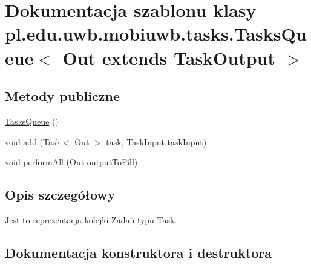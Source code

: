 \hypertarget{classpl_1_1edu_1_1uwb_1_1mobiuwb_1_1tasks_1_1_tasks_queue}{}\section{Dokumentacja szablonu klasy pl.\+edu.\+uwb.\+mobiuwb.\+tasks.\+Tasks\+Queue$<$ Out extends Task\+Output $>$}
\label{classpl_1_1edu_1_1uwb_1_1mobiuwb_1_1tasks_1_1_tasks_queue}
\subsection*{Metody publiczne}
\begin{DoxyCompactItemize}
\item 
\hyperlink{classpl_1_1edu_1_1uwb_1_1mobiuwb_1_1tasks_1_1_tasks_queue_a60832783af9146d33f6ac0861425d889}{Tasks\+Queue} ()
\item 
void \hyperlink{classpl_1_1edu_1_1uwb_1_1mobiuwb_1_1tasks_1_1_tasks_queue_a7084890f5443a1133713e058001c0142}{add} (\hyperlink{interfacepl_1_1edu_1_1uwb_1_1mobiuwb_1_1tasks_1_1_task}{Task}$<$ Out $>$ task, \hyperlink{classpl_1_1edu_1_1uwb_1_1mobiuwb_1_1tasks_1_1models_1_1_task_input}{Task\+Input} task\+Input)
\item 
void \hyperlink{classpl_1_1edu_1_1uwb_1_1mobiuwb_1_1tasks_1_1_tasks_queue_aa08a5bda96e6d84c75744e6757f2f8a4}{perform\+All} (Out output\+To\+Fill)
\end{DoxyCompactItemize}


\subsection{Opis szczegółowy}
Jest to reprezentacja kolejki Zadań typu \hyperlink{interfacepl_1_1edu_1_1uwb_1_1mobiuwb_1_1tasks_1_1_task}{Task}. 

\subsection{Dokumentacja konstruktora i destruktora}
\hypertarget{classpl_1_1edu_1_1uwb_1_1mobiuwb_1_1tasks_1_1_tasks_queue_a60832783af9146d33f6ac0861425d889}{}

